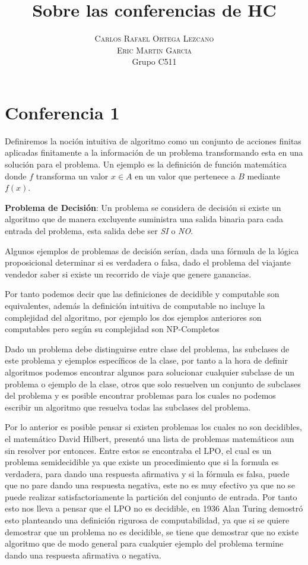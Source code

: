 \documentclass[]{article}
\title{Sobre las conferencias de HC} %
\author{%
\textsc{Carlos Rafael Ortega Lezcano}\\[1ex]
\textsc{Eric Martin Garcia} \\[1ex]
\normalsize Grupo C511 \\ %
}
\date{}
\begin{document}
\maketitle


\section*{Conferencia 1}

Definiremos la noción intuitiva de algoritmo como un conjunto de acciones finitas aplicadas finitamente a la información de un problema transformando esta en una solución para el problema. Un ejemplo es la definición de función matemática donde $f$ transforma un valor $x \in A$ en un valor que pertenece a $B$ mediante $f(x)$.

\textbf{Problema de Decisión}: Un problema se considera de decisión si existe un algoritmo que de manera excluyente suministra una salida binaria para cada entrada del problema, esta salida debe ser \textit{SI} o \textit{NO}.

Algunos ejemplos de problemas de decisión serían, dada una fórmula de la lógica proposicional determinar si es verdadera o falsa, dado el problema del viajante vendedor saber si existe un recorrido de viaje que genere ganancias. 

Por tanto podemos decir que las definiciones de decidible y computable son equivalentes, además la definición intuitiva de computable no incluye la complejidad del algoritmo, por ejemplo los dos ejemplos anteriores son computables pero según su complejidad son NP-Completos

Dado un problema debe distinguirse entre clase del problema, las subclases de este problema y ejemplos específicos de la clase, por tanto a la hora de definir algoritmos podemos encontrar algunos para solucionar cualquier subclase de un problema o ejemplo de la clase, otros que solo resuelven un conjunto de subclases del problema y es posible encontrar problemas para los cuales no podemos escribir un algoritmo que resuelva todas las subclases del problema.

Por lo anterior es posible pensar si existen problemas los cuales no son decidibles, el matemático David Hilbert, presentó una lista de problemas matemáticos aun sin resolver por entonces. Entre estos se encontraba el LPO, el cual es un problema semidecidible ya que existe un procedimiento que si la formula es verdadera, para dando una respuesta afirmativa y si la fórmula es falsa, puede que no pare dando una respuesta negativa, este no es muy efectivo ya que no se puede realizar satisfactoriamente la partición del conjunto de entrada. Por tanto esto nos lleva a pensar que el LPO no es decidible, en 1936 Alan Turing demostró esto planteando una definición rigurosa de computabilidad, ya que si se quiere demostrar que un problema no es decidible, se tiene que demostrar que no existe algoritmo que de modo general para cualquier ejemplo del problema termine dando una respuesta afirmativa o negativa.
\end{document}
